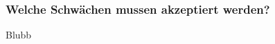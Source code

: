 \subsubsection{Welche Schwächen mussen akzeptiert werden?}\label{diskussion:schwaechen:akzeptieren}

Blubb
